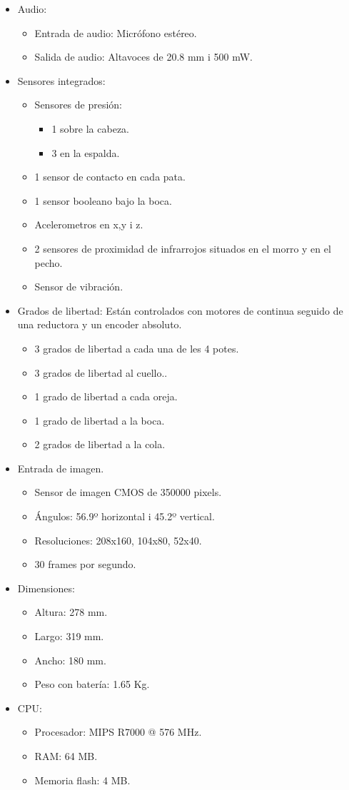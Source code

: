 \documentclass[12pt,a4paper,final,twoside]{article}
\begin{document}
\begin{itemize}
\item Audio:
\begin{itemize}
\item Entrada de audio: Micrófono estéreo.
\item Salida de audio: Altavoces de 20.8 mm i 500 mW.
\end{itemize}
\item Sensores integrados:
\begin{itemize}
\item Sensores de presión:
\begin{itemize}
\item 1 sobre la cabeza.
\item 3 en la espalda.
\end{itemize}
\item 1 sensor de contacto en cada pata. 
\item 1 sensor booleano bajo la boca.
\item Acelerometros en x,y i z.
\item 2 sensores de proximidad de infrarrojos situados en el morro y en el pecho.
\item Sensor de vibración.
\end{itemize}
\item Grados de libertad: Están controlados con motores de continua seguido de una reductora y un encoder absoluto.
\begin{itemize}
\item 3 grados de libertad a cada una de les 4 potes.
\item 3 grados de libertad al cuello..
\item 1 grado de libertad a cada oreja.
\item 1 grado de libertad a la boca.
\item 2 grados de libertad a la cola. 
\end{itemize}
\item Entrada de imagen.
\begin{itemize}
\item Sensor de imagen CMOS de 350000 pixels.
\item Ángulos: 56.9º horizontal i 45.2º vertical.
\item Resoluciones: 208x160, 104x80, 52x40.
\item 30 frames por segundo.
\end{itemize}
\item Dimensiones:
\begin{itemize}
\item Altura: 278 mm.
\item Largo: 319 mm.
\item Ancho: 180 mm.
\item Peso con batería: 1.65 Kg. 
\end{itemize}
\item CPU:
\begin{itemize}
\item Procesador: MIPS R7000 @ 576 MHz.
\item RAM: 64 MB.
\item Memoria flash: 4 MB.
\end{itemize}
\end{itemize}
\end{document}
